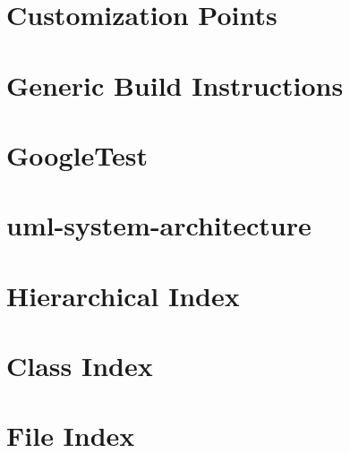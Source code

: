 \let\mypdfximage\pdfximage\def\pdfximage{\immediate\mypdfximage}\documentclass[twoside]{book}
\newcommand{\+}{\discretionary{\mbox{\scriptsize$\hookleftarrow$}}{}{}}
\begin{document}
\chapter{Customization Points}
\label{md__home_omar_SEP25_build__deps_googletest_src_googletest_include_gtest_internal_custom_README}

\chapter{Generic Build Instructions}
\label{md__home_omar_SEP25_build__deps_googletest_src_googletest_README}

\chapter{Google\+Test}
\label{md__home_omar_SEP25_build__deps_googletest_src_README}

\chapter{uml-\/system-\/architecture}
\label{md_design_uml_system_architecture}

\chapter{Hierarchical Index}

\chapter{Class Index}

\chapter{File Index}

\end{document}
